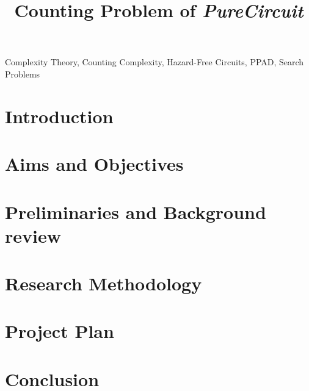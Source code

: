 \documentclass[onecolumn]{IEEEtran}
\begin{document}
\title{Counting Problem of \textit{PureCircuit}}

\author{
}

\maketitle

\begin{abstract}

\end{abstract}

\begin{IEEEkeywords} %
Complexity Theory, Counting Complexity, Hazard-Free Circuits, PPAD, Search Problems
\end{IEEEkeywords}

\section{Introduction}


\section{Aims and Objectives}

\section{Preliminaries and Background review}


\section{Research Methodology} 


\section{Project Plan} 


\section{Conclusion} 

    


\end{document}
